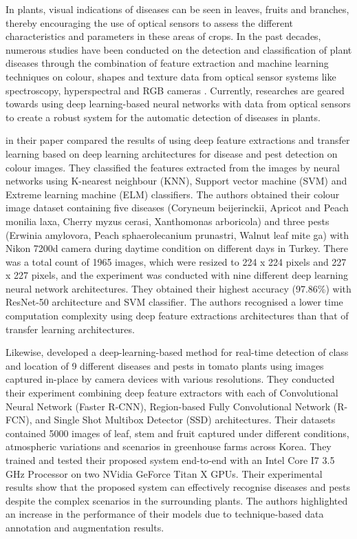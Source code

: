 In plants, visual indications of diseases can be seen in leaves, fruits and branches, thereby encouraging the use of optical sensors to assess the different characteristics and parameters in these areas of crops. In the past decades, numerous studies have been conducted on the detection and classification of plant diseases through the combination of feature extraction and machine learning techniques on colour, shapes and texture data from optical sensor systems like spectroscopy, hyperspectral and RGB cameras \cite{xu1996monitoring, hillnhutter2011remote, ramesh2018plant, raza2015automatic}. Currently, researches are geared towards using deep learning-based neural networks with data from optical sensors to create a robust system for the automatic detection of diseases in plants.


\cite{turkouglu2019plant} in their paper compared the results of using deep feature extractions and transfer learning based on deep learning architectures for disease and pest detection on colour images. They classified the features extracted from the images by neural networks using K-nearest neighbour (KNN), Support vector machine (SVM) and Extreme learning machine (ELM) classifiers. The authors obtained their colour image dataset containing five diseases (Coryneum beijerinckii, Apricot and Peach monilia laxa, Cherry myzus cerasi, Xanthomonas arboricola) and three pests (Erwinia amylovora, Peach sphaerolecanium prunastri, Walnut leaf mite ga) with Nikon 7200d camera during daytime condition on different days in Turkey. There was a total count of 1965 images, which were resized to 224 x 224 pixels and 227 x 227 pixels, and the experiment was conducted with nine different deep learning neural network architectures. They obtained their highest accuracy (97.86\%) with ResNet-50 architecture and SVM classifier. The authors recognised a lower time computation complexity using deep feature extractions architectures than that of transfer learning architectures.

Likewise, \cite{fuentes2017robust} developed a deep-learning-based method for real-time detection of class and location of 9 different diseases and pests in tomato plants using images captured in-place by camera devices with various resolutions. They conducted their experiment combining deep feature extractors with each of Convolutional Neural Network (Faster R-CNN), Region-based Fully Convolutional Network (R-FCN), and Single Shot Multibox Detector (SSD) architectures. Their datasets contained 5000 images of leaf, stem and fruit captured under different conditions, atmospheric variations and scenarios in greenhouse farms across Korea. They trained and tested their proposed system end-to-end with an Intel Core I7 3.5 GHz Processor on two NVidia GeForce Titan X GPUs. Their experimental results show that the proposed system can effectively recognise diseases and pests despite the complex scenarios in the surrounding plants. The authors highlighted an increase in the performance of their models due to technique-based data annotation and augmentation results.

